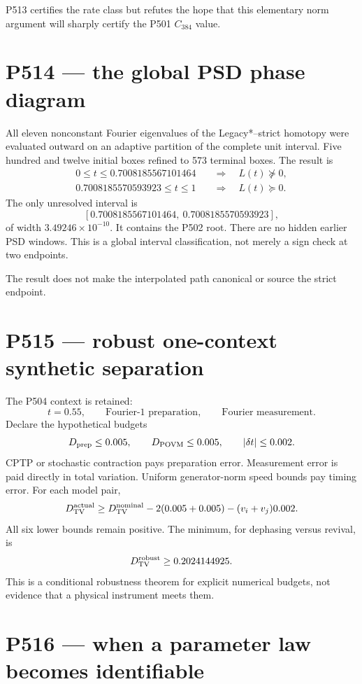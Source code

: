 \documentclass[11pt,a4paper]{article}
\theoremstyle{definition}
\theoremstyle{remark}
\begin{document}
P513 certifies the rate class but refutes the hope that this elementary norm argument will sharply certify the P501 $C_{384}$ value.

\section{P514 --- the global PSD phase diagram}

All eleven nonconstant Fourier eigenvalues of the Legacy*--strict homotopy were evaluated outward on an adaptive partition of the complete unit interval. Five hundred and twelve initial boxes refined to 573 terminal boxes. The result is
\begin{align*}
 0\le t\le0.7008185567101464 &\quad\Longrightarrow\quad L(t)\not\succeq0,\\
 0.7008185570593923\le t\le1 &\quad\Longrightarrow\quad L(t)\succeq0.
\end{align*}
The only unresolved interval is
\[
 [0.7008185567101464,\ 0.7008185570593923],
\]
of width $3.49246\times10^{-10}$. It contains the P502 root. There are no hidden earlier PSD windows. This is a global interval classification, not merely a sign check at two endpoints.

The result does not make the interpolated path canonical or source the strict endpoint.

\section{P515 --- robust one-context synthetic separation}

The P504 context is retained:
\[
 t=0.55,\qquad \text{Fourier-1 preparation},\qquad \text{Fourier measurement}.
\]
Declare the hypothetical budgets
\[
 D_{\rm prep}\le0.005,\qquad
 D_{\rm POVM}\le0.005,\qquad
 |\delta t|\le0.002.
\]
CPTP or stochastic contraction pays preparation error. Measurement error is paid directly in total variation. Uniform generator-norm speed bounds pay timing error. For each model pair,
\[
 D_{\rm TV}^{\rm actual}\ge D_{\rm TV}^{\rm nominal}
 -2(0.005+0.005)-(v_i+v_j)0.002.
\]
All six lower bounds remain positive. The minimum, for dephasing versus revival, is
\[
 D_{\rm TV}^{\rm robust}\ge0.2024144925.
\]
This is a conditional robustness theorem for explicit numerical budgets, not evidence that a physical instrument meets them.

\section{P516 --- when a parameter law becomes identifiable}
\end{document}
